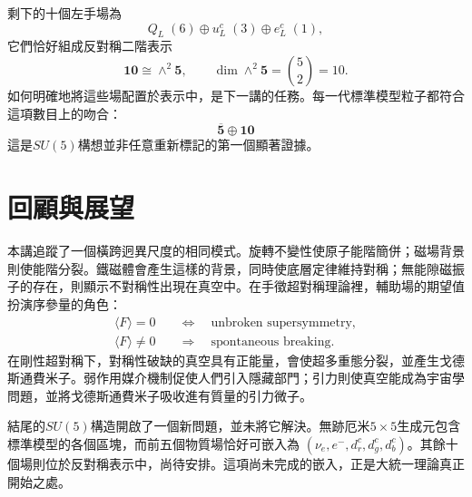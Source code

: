 剩下的十個左手場為
\begin{equation}
Q_L\;(6)
\oplus
u^c_L\;(3)
\oplus
e^c_L\;(1),
\end{equation}
它們恰好組成反對稱二階表示
\begin{equation}
\mathbf{10}\cong\wedge^2\mathbf5,
\qquad
\dim\wedge^2\mathbf5=\binom52=10.
\label{eq:l9-ten-preview}
\end{equation}
如何明確地將這些場配置於表示中，是下一講的任務。每一代標準模型粒子都符合這項數目上的吻合：
\begin{equation}
\overline{\mathbf5}\oplus\mathbf{10}
\end{equation}
這是\(SU(5)\)構想並非任意重新標記的第一個顯著證據。

\begin{classroomqa}
\end{classroomqa}

\section{回顧與展望}

本講追蹤了一個橫跨迥異尺度的相同模式。旋轉不變性使原子能階簡併；磁場背景則使能階分裂。鐵磁體會產生這樣的背景，同時使底層定律維持對稱；無能隙磁振子的存在，則顯示不對稱性出現在真空中。在手徵超對稱理論裡，輔助場的期望值扮演序參量的角色：
\begin{equation}
\begin{aligned}
\langle F\rangle=0
&\quad\Longleftrightarrow\quad
\text{unbroken supersymmetry},\\
\langle F\rangle\neq0
&\quad\Longrightarrow\quad
\text{spontaneous breaking}.
\end{aligned}
\end{equation}
在剛性超對稱下，對稱性破缺的真空具有正能量，會使超多重態分裂，並產生戈德斯通費米子。弱作用媒介機制促使人們引入隱藏部門；引力則使真空能成為宇宙學問題，並將戈德斯通費米子吸收進有質量的引力微子。

結尾的\(SU(5)\)構造開啟了一個新問題，並未將它解決。無跡厄米\(5\times5\)生成元包含標準模型的各個區塊，而前五個物質場恰好可嵌入為
\((\nu_e,e^-,d^c_r,d^c_g,d^c_b)\)。其餘十個場則位於反對稱表示中，尚待安排。這項尚未完成的嵌入，正是大統一理論真正開始之處。
